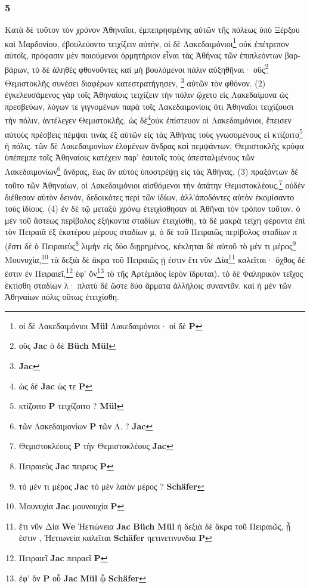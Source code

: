 \subsubsection*{5} \textgreek{Κατὰ δὲ τοῦτον τὸν χρόνον Ἀθηναῖοι, ἐμπεπρησμένης αὐτῶν τῆς πόλεως ὑπὸ Ξέρξου καὶ Μαρδονίου, ἐβουλεύοντο τειχίζειν αὐτήν, οἱ δὲ Λακεδαιμόνιοι}\footnote{\textgreek{οἱ δὲ Λακεδαιμόνιοι} \textbf{Mül} \textgreek{Λακεδαιμόνιοι· οἱ δὲ}  \textbf{P}} \textgreek{οὐκ ἐπέτρεπον αὐτοῖς, πρόφασιν μὲν ποιούμενοι ὁρμητήριον εἶναι τὰς Ἀθήνας τῶν ἐπιπλεόντων βαρβάρων, τὸ δὲ ἀληθὲς φθονοῦντες καὶ μὴ βουλόμενοι πάλιν αὐξηθῆναι· οὓς}\footnote{\textgreek{οὓς} \textbf{Jac}\textgreek{ ὁ δὲ}  \textbf{Büch} \textbf{Mül}} \textgreek{Θεμιστοκλῆς συνέσει διαφέρων  κατεστρατήγησεν, }\footnote{\textgreek{} \textbf{Jac} } \textgreek{αὐτῶν τὸν φθόνον. (2) ἐγκελευσάμενος γὰρ τοῖς Ἀθηναίοις τειχίζειν τὴν πόλιν ᾤχετο εἰς Λακεδαίμονα   ὡς πρεσβεύων, λόγων τε γιγνομένων παρὰ τοῖς Λακεδαιμονίοις ὅτι Ἀθηναῖοι  τειχίζουσι τὴν πόλιν, ἀντέλεγεν Θεμιστοκλῆς. ὡς δὲ}\footnote{\textgreek{ὡς δὲ} \textbf{Jac} \textgreek{ὡς τε}  \textbf{P}}\textgreek{οὐκ ἐπίστευον οἱ Λακεδαιμόνιοι, ἔπεισεν αὐτοὺς πρέσβεις πέμψαι τινὰς ἐξ αὐτῶν εἰς τὰς Ἀθήνας τοὺς γνωσομένους εἰ κτίζοιτο}\footnote{\textgreek{κτίζοιτο}  \textbf{P} \textgreek{τειχίζοιτο} ? \textbf{Mül}} \textgreek{ἡ πόλις. τῶν δὲ Λακεδαιμονίων ἑλομένων ἄνδρας καὶ πεμψάντων, Θεμιστοκλῆς κρύφα ὑπέπεμπε τοῖς Ἀθηναίοις κατέχειν παρ’ ἑαυτοῖς τοὺς ἀπεσταλμένους τῶν Λακεδαιμονίων}\footnote{\textgreek{τῶν Λακεδαιμονίων}  \textbf{P} \textgreek{ τῶν Λ. }? \textbf{Jac}} \textgreek{ἄνδρας, ἕως ἂν αὐτὸς ὑποστρέψῃ εἰς τὰς Ἀθήνας. (3) πραξάντων δὲ τοῦτο τῶν Ἀθηναίων, οἱ Λακεδαιμόνιοι αἰσθόμενοι τὴν ἀπάτην Θεμιστοκλέους,}\footnote{\textgreek{Θεμιστοκλέους}  \textbf{P} \textgreek{τὴν Θεμιστοκλέους} \textbf{Jac}} \textgreek{οὐδὲν διέθεσαν αὐτὸν δεινόν, δεδοικότες περὶ τῶν ἰδίων, ἀλλ’ἀποδόντες αὐτὸν ἐκομίσαντο τοὺς ἰδίους. (4) ἐν δὲ τῷ μεταξὺ χρόνῳ ἐτειχίσθησαν αἱ Ἀθῆναι τὸν τρόπον τοῦτον. ὁ μὲν τοῦ ἄστεως περίβολος  ἑξήκοντα σταδίων ἐτειχίσθη, τὰ δὲ μακρὰ τείχη φέροντα ἐπὶ τὸν Πειραιᾶ ἐξ ἑκατέρου μέρους σταδίων μ, ὁ δὲ τοῦ Πειραιῶς περίβολος σταδίων π (ἔστι δὲ ὁ Πειραιεὺς}\footnote{\textgreek{Πειραιεὺς} \textbf{Jac} \textgreek{πειρευς}  \textbf{P}} \textgreek{λιμὴν εἰς δύο διῃρημένος, κέκληται δὲ αὐτοῦ τὸ μέν τι μέρος}\footnote{\textgreek{τὸ μέν τι μέρος} \textbf{Jac} \textgreek{τὸ μὲν λαιὸν μέρος} ? \textbf{Schäfer}} \textgreek{Μουνυχία,}\footnote{\textgreek{Μουνυχία} \textbf{Jac} \textgreek{μουνουχία}  \textbf{P}} \textgreek{τὰ δεξιὰ δὲ ἄκρα τοῦ Πειραιῶς ᾑ ἐστιν ἔτι νῦν Δία}\footnote{\textgreek{ἔτι νῦν Δία}  \textbf{We} \textgreek{Ἠετιώνεια} \textbf{Jac}  \textbf{Büch} \textbf{Mül} \textgreek{ἡ δεξιὰ δὲ ἄκρα τοῦ Πειραιῶς, ᾗ ἑστιν , Ἠετιωνεία καλεῖται}  \textbf{Schäfer} \textgreek{ηετινετινυνδια} \textbf{P}} \textgreek{καλεῖται· ὄχθος δέ ἐστιν ἐν Πειραιεῖ,}\footnote{\textgreek{Πειραιεῖ} \textbf{Jac} \textgreek{πειραεῖ}  \textbf{P}} \textgreek{ἐφ’ ὅν}\footnote{\textgreek{ἐφ’ ὅν}  \textbf{P} \textgreek{οὗ} \textbf{Jac} \textbf{Mül} \textgreek{ᾧ} \textbf{Schäfer}} \textgreek{τὸ τῆς Ἀρτέμιδος ἱερὸν ἵδρυται). τὸ  δὲ Φαληρικὸν τεῖχος ἐκτίσθη σταδίων λ· πλατὺ δὲ ὥστε δύο ἅρματα  ἀλλήλοις συναντᾶν. καὶ ἡ μὲν τῶν Ἀθηναίων πόλις οὕτως ἐτειχίσθη.}

